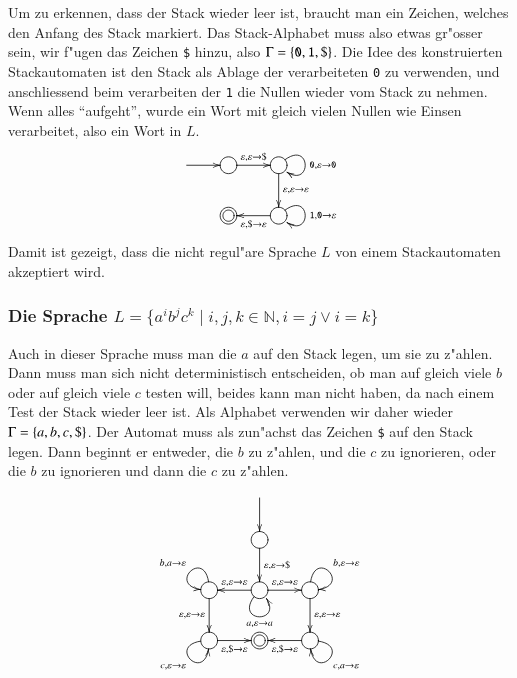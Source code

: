 Um zu erkennen, dass der Stack wieder leer ist, braucht man ein Zeichen,
welches den Anfang des Stack markiert. Das Stack-Alphabet muss also 
etwas gr"osser sein, wir f"ugen das Zeichen {\tt \$} hinzu, also
$\Gamma=\{{\tt 0},{\tt 1},{\tt \$}\}$.
Die Idee des konstruierten Stackautomaten ist den Stack als Ablage der
verarbeiteten {\tt 0} zu verwenden, und anschliessend beim verarbeiten
der  {\tt 1} die Nullen wieder vom Stack zu nehmen. Wenn alles ``aufgeht'',
wurde ein Wort mit gleich vielen Nullen wie Einsen verarbeitet, also 
ein Wort in $L$.
\[
\entrymodifiers={++[o][F]}
\xymatrix{
*+\txt{}\ar[r]
	&{}\ar[r]^{\varepsilon,\varepsilon\to{\tt \$}}
		&{} \ar@(ur,dr)^{{\tt 0},\varepsilon\to{\tt 0}}
		    \ar[d]^{\varepsilon,\varepsilon\to\varepsilon}
\\
*+\txt{}
	&*++[o][F=]{}
		&{}\ar[l]^{\varepsilon,{\tt \$}\to\varepsilon}
		   \ar@(ur,dr)^{{\tt 1},{\tt 0}\to\varepsilon}
}
\]
Damit ist gezeigt, dass die nicht regul"are Sprache $L$ von einem Stackautomaten
akzeptiert wird.

\subsubsection{Die Sprache $L=\{a^ib^jc^k\;|\;i,j,k\in\mathbb N, i=j\vee i=k\}$}
Auch in dieser Sprache muss man die $a$ auf den Stack legen, um sie
zu z"ahlen. Dann muss man sich nicht deterministisch entscheiden,
ob man auf gleich viele $b$ oder auf gleich viele $c$ testen will,
beides kann man nicht haben, da nach einem Test der Stack wieder leer
ist. Als Alphabet verwenden wir daher wieder $\Gamma=\{a,b,c,{\tt\$}\}$.
Der Automat muss als zun"achst das Zeichen {\tt\$} auf den Stack legen.
Dann beginnt er entweder, die $b$ zu z"ahlen, und die $c$ zu ignorieren,
oder die $b$ zu ignorieren und dann die $c$ zu z"ahlen.
\[
\entrymodifiers={++[o][F]}
\xymatrix{
*+\txt{}
	&*+\txt{}\ar[d]
\\
*+\txt{}
	&{}\ar[d]^{\varepsilon,\varepsilon\to{\tt\$}}
\\
{}\ar@(u,l)_{b,a\to\varepsilon}
  \ar[d]_{\varepsilon,\varepsilon\to\varepsilon}
	&{}\ar@(dl,dr)_{a,\varepsilon\to a}
	   \ar[l]_{\varepsilon,\varepsilon\to\varepsilon}
	   \ar[r]^{\varepsilon,\varepsilon\to\varepsilon}
		&{}\ar@(u,r)^{b,\varepsilon\to\varepsilon}
		   \ar[d]^{\varepsilon,\varepsilon\to\varepsilon}
\\
{}\ar@(l,d)_{c,\varepsilon\to\varepsilon}
  \ar[r]_{\varepsilon,{\tt\$}\to\varepsilon}
	&*++[o][F=]{}
		&\ar@(r,d)^{c,a\to\varepsilon}
		  \ar[l]^{\varepsilon,{\tt\$}\to\varepsilon}
}
\]

